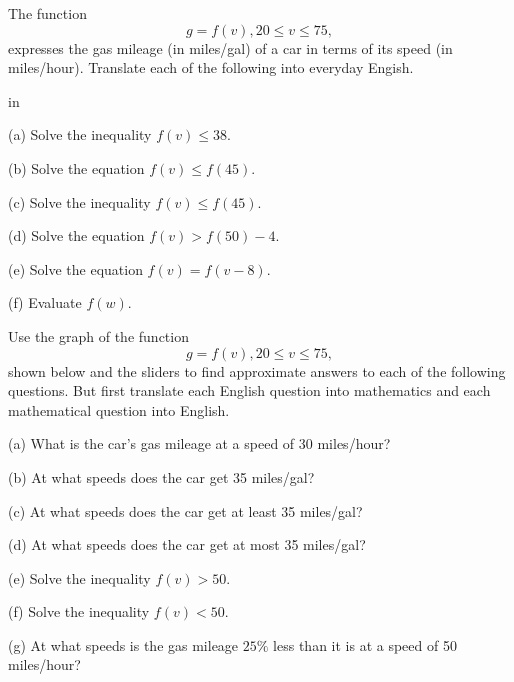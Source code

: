 \documentclass{ximera}
\newcommand{\pskip}{\vskip 0.1 in}
\begin{document}
\begin{example}  \label{ExFun2}

The function
\[
   g = f(v) , 20 \leq v \leq 75 ,
\]
expresses the gas mileage (in miles/gal) of a car in terms of its speed (in miles/hour). Translate each of the following into everyday Engish.

\pskip

\noindent (a) Solve the inequality $f(v)\leq 38$.

\noindent (b) Solve the equation $f(v) \leq f(45)$.

\noindent (c) Solve the inequality $f(v) \leq f(45)$.

\noindent (d) Solve the equation $f(v)> f(50)-4$.

\noindent (e) Solve the equation $f(v)=f(v-8)$.

\noindent (f) Evaluate $f(w)$.

\end{example}


\begin{example}  \label{ExFun3}
Use the graph of the function 
\[
    g = f(v) , 20\leq v \leq 75 ,
\]
shown below and the sliders to find approximate answers to each of the following questions. But first translate each English question into mathematics and each mathematical question into English.

(a) What is the car's gas mileage at a speed of 30 miles/hour?

(b) At what speeds does the car get 35 miles/gal?

(c)  At what speeds does the car get at least 35 miles/gal?

(d)  At what speeds does the car get at most 35 miles/gal?

(e) Solve the inequality $f(v)> 50$.

(f) Solve the inequality $f(v)<50$.

(g) At what speeds is the gas mileage $25\%$ less than it is at a speed of 50 miles/hour?



\begin{exploration}\label{exp:Fun3}


 
\begin{onlineOnly}
    \begin{center}
\end{center}
\end{onlineOnly}
\end{exploration}



\end{example}
\end{document}
